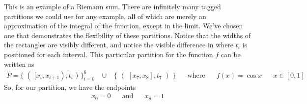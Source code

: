 \begin{example}
This is an example of a Riemann sum. There are infinitely many tagged partitions we could use for any example, all of which are merely an approximation of the integral of the function, except in the limit. We've chosen one that demonstrates the flexibility of these partitions. Notice that the widths of the rectangles are visibly different, and notice the visible difference in where $t_{i}$ is positioned for each interval. This particular partition for the function $f$ can be written as
\begin{align*}
    \dot P = \{ \hspace{4pt} ( \hspace{4pt} [x_{i}, x_{i+1}), t_{i} \hspace{4pt} ) \hspace{4pt} \}_{i = 0}^{6} \hspace{10pt} \cup \hspace{10pt} \{ \hspace{4pt} ( \hspace{4pt} [x_{7}, x_{8}], t_{7} \hspace{4pt} ) \hspace{4pt} \} \hspace{20pt} \text{where} \hspace{20pt} f(x) = \cos x \hspace{20pt} x \in [0, 1]  
\end{align*}
So, for our partition, we have the endpoints
\begin{align*}
    x_{0} = 0 \hspace{20pt} \text{and} \hspace{20pt} x_{8} = 1
\end{align*}
\end{example}
